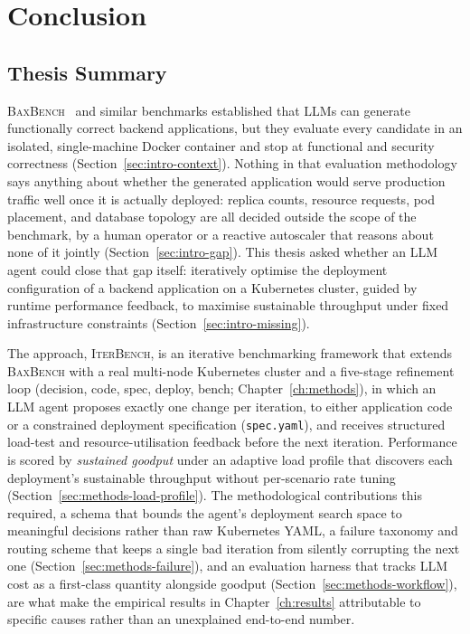 
\chapter{Conclusion}
\label{ch:conclusion}


\section{Thesis Summary}
\label{sec:conclusion-summary}

\textsc{BaxBench}~\cite{vero2025baxbench} and similar benchmarks established
that LLMs can generate functionally correct backend applications, but they
evaluate every candidate in an isolated, single-machine Docker container
and stop at functional and security correctness
(Section~\ref{sec:intro-context}). Nothing in that evaluation methodology
says anything about whether the generated application would serve
production traffic well once it is actually deployed: replica counts,
resource requests, pod placement, and database topology are all decided
outside the scope of the benchmark, by a human operator or a reactive
autoscaler that reasons about none of it jointly
(Section~\ref{sec:intro-gap}). This thesis asked whether an LLM agent
could close that gap itself: iteratively optimise the deployment
configuration of a backend application on a Kubernetes cluster, guided by
runtime performance feedback, to maximise sustainable throughput under
fixed infrastructure constraints (Section~\ref{sec:intro-missing}).

The approach, \textsc{IterBench}, is an iterative benchmarking framework that
extends \textsc{BaxBench} with a real multi-node Kubernetes cluster and a
five-stage refinement loop (decision, code, spec, deploy, bench;
Chapter~\ref{ch:methods}), in which an LLM agent proposes exactly one
change per iteration, to either application code or a constrained
deployment specification (\texttt{spec.yaml}), and receives structured
load-test and resource-utilisation feedback before the next iteration.
Performance is scored by \emph{sustained goodput} under an adaptive load
profile that discovers each deployment's sustainable throughput without
per-scenario rate tuning (Section~\ref{sec:methods-load-profile}). The
methodological contributions this required, a schema that bounds the
agent's deployment search space to meaningful decisions rather than raw
Kubernetes YAML, a failure taxonomy and routing scheme that keeps a
single bad iteration from silently corrupting the next one
(Section~\ref{sec:methods-failure}), and an evaluation harness that
tracks LLM cost as a first-class quantity alongside goodput
(Section~\ref{sec:methods-workflow}), are what make the empirical results
in Chapter~\ref{ch:results} attributable to specific causes rather than an
unexplained end-to-end number.


